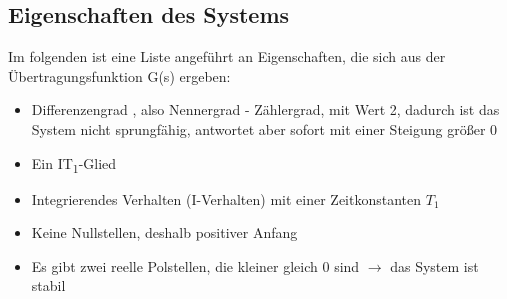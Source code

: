 \subsection{Eigenschaften des Systems}

Im folgenden ist eine Liste angeführt an Eigenschaften, die sich aus der Übertragungsfunktion G(s) ergeben:
\begin{itemize}
	\item Differenzengrad , also Nennergrad - Zählergrad, mit Wert 2, dadurch ist das System nicht sprungfähig, antwortet aber sofort mit einer Steigung größer 0
	\item Ein IT\textsubscript{1}-Glied
	\item Integrierendes Verhalten (I-Verhalten) mit einer Zeitkonstanten $T_1$
	\item Keine Nullstellen, deshalb positiver Anfang
	\item Es gibt zwei reelle Polstellen, die kleiner gleich 0 sind $\rightarrow$ das System ist stabil
\end{itemize}